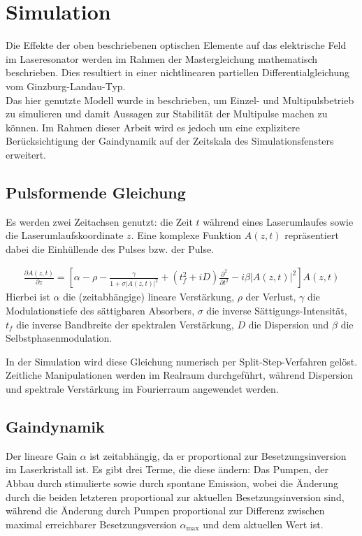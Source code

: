 \documentclass[bachelor,       %
               twoside,        %
               BCOR10mm,       %
               liststotoc,nomtotoc,bibtotoc, %
               english,ngerman, %
               final,          %
               ]{GAUBM}
\begin{document}
\section{Simulation}
\label{sec:SimTheo}
Die Effekte der oben beschriebenen optischen Elemente auf das elektrische Feld im Laseresonator werden im Rahmen der Mastergleichung \cite{haus_mode-locking_2000} mathematisch beschrieben.
Dies resultiert in einer nichtlinearen partiellen Differentialgleichung vom Ginzburg-Landau-Typ.\\
Das hier genutzte Modell wurde in \cite{kalashnikov_multipulse_2003} beschrieben, um Einzel- und Multipulsbetrieb zu simulieren und damit Aussagen zur Stabilität der Multipulse machen zu können.
Im Rahmen dieser Arbeit wird es jedoch um eine explizitere Berücksichtigung der Gaindynamik auf der Zeitskala des Simulationsfensters erweitert.


\subsection{Pulsformende Gleichung}
Es werden zwei Zeitachsen genutzt: die Zeit $t$ während eines Laserumlaufes sowie die Laserumlaufskoordinate $z$.
Eine komplexe Funktion $A(z,t)$ repräsentiert dabei die Einhüllende des Pulses bzw. der Pulse. 

\begin{align}
	\frac{\partial A(z,t)}{\partial z}=\left[\alpha-\rho-\frac{\gamma}{1+\sigma|A(z,t)|^2}+(t_f^2+iD)\frac{\partial^2}{\partial t^2}-i\beta |A(z,t)|^2\right]A(z,t)
	\label{eq:ginzburgLandau}
\end{align}
Hierbei ist $\alpha$ die (zeitabhängige) lineare Verstärkung, $\rho$ der Verlust, $\gamma$ die Modulationstiefe des sättigbaren Absorbers, $\sigma$ die inverse Sättigungs-Intensität, $t_f$ die inverse Bandbreite der spektralen Verstärkung, $D$ die Dispersion und $\beta$ die Selbstphasenmodulation.

In der Simulation wird diese Gleichung numerisch per Split-Step-Verfahren gelöst.
Zeitliche Manipulationen werden im Realraum durchgeführt, während Dispersion und spektrale Verstärkung im Fourierraum angewendet werden.

\subsection{Gaindynamik}
Der lineare Gain $\alpha$ ist zeitabhängig, da er proportional zur Besetzungsinversion im Laserkristall ist.
Es gibt drei Terme, die diese ändern:
Das Pumpen, der Abbau durch stimulierte sowie durch spontane Emission, wobei die Änderung durch die beiden letzteren proportional zur aktuellen Besetzungsinversion sind, während die Änderung durch Pumpen proportional zur Differenz zwischen maximal erreichbarer Besetzungsversion $\alpha_\text{max}$ und dem aktuellen Wert ist.
\end{document}
